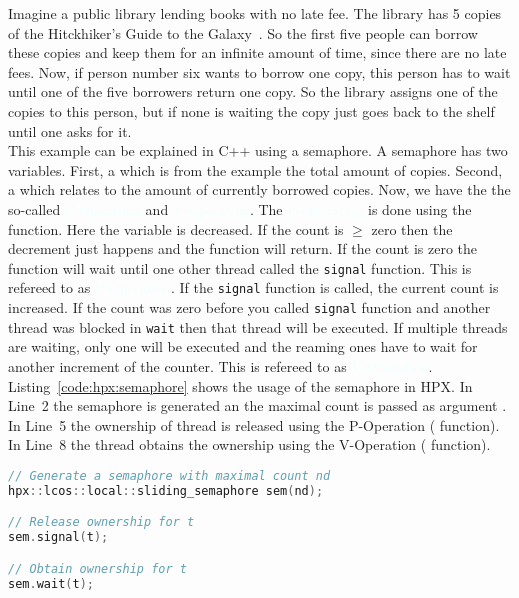 Imagine a public library lending books with no late fee. The library has 5 copies of the Hitckhiker's Guide to the Galaxy~\cite{adams2017ultimate}. So the first five people can borrow these copies and keep them for an infinite amount of time, since there are no late fees. Now, if person number six wants to borrow one copy, this person has to wait until one of the five borrowers return one copy. So the library assigns one of the copies to this person, but if none is waiting the copy just goes back to the shelf until one asks for it. \\

This example can be explained in C++ using a semaphore. A semaphore has two variables. First, a  which is from the example the total amount of copies. Second, a  which relates to the amount of currently borrowed copies. Now, we have the the so-called \textcolor{azure}{P-Operation} and \textcolor{azure}{V-Operation}. The \textcolor{azure}{P-Operation} is done using the  function. Here the variable  is decreased. If the count is $\geq$ zero then the decrement just happens and the function will return. If the count is zero the function will wait until one other thread called the \lstinline|signal| function. This is refereed to as \textcolor{azure}{P-Operation}. If the \lstinline|signal| function is called, the current count is increased. If the count was zero before you called \lstinline|signal| function and another thread was blocked in \lstinline|wait| then that thread will be executed. If multiple threads are waiting, only one will be executed and the reaming ones have to wait for another increment of the counter. This is refereed to as \textcolor{azure}{V-Operation}. Listing~\ref{code:hpx:semaphore} shows the usage of the semaphore in HPX. In Line~2 the semaphore is generated an the maximal count is passed as argument . In Line~5 the ownership of thread  is released using the P-Operation ( function). In Line~8 the thread  obtains the ownership using the V-Operation ( function).


\begin{lstlisting}[language=c++,caption={HPX's semaphores.\label{code:hpx:semaphore}},float,floatplacement=tb]
// Generate a semaphore with maximal count nd
hpx::lcos::local::sliding_semaphore sem(nd);

// Release ownership for t
sem.signal(t);

// Obtain ownership for t
sem.wait(t);
\end{lstlisting}


